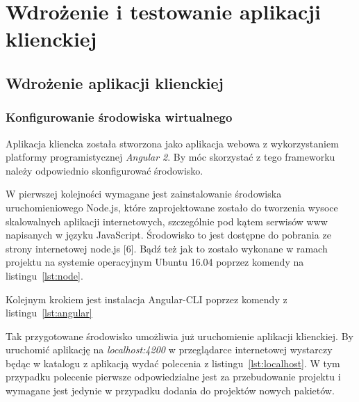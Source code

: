\chapter{Wdrożenie i testowanie aplikacji klienckiej}

\section{Wdrożenie aplikacji klienckiej}
\subsection{Konfigurowanie środowiska wirtualnego}
Aplikacja kliencka została stworzona jako aplikacja webowa z wykorzystaniem platformy programistycznej \textit{Angular 2}. By móc skorzystać z tego frameworku należy odpowiednio skonfigurować środowisko.

W pierwszej kolejności wymagane jest zainstalowanie środowiska uruchomieniowego Node.js, które zaprojektowane zostało do tworzenia wysoce skalowalnych aplikacji internetowych, szczególnie pod kątem serwisów www napisanych w języku JavaScript. \'Srodowisko to jest dostępne do pobrania ze strony internetowej node.js [6]. Bądź też jak to zostało wykonane w ramach projektu na systemie operacyjnym Ubuntu 16.04 poprzez komendy na listingu~\ref{lst:node}.

\lssetdef


Kolejnym krokiem jest instalacja Angular-CLI poprzez komendy z listingu~\ref{lst:angular}

\lssetdef


Tak przygotowane środowisko umożliwia już uruchomienie aplikacji klienckiej. By uruchomić aplikację na \textit{localhost:4200} w przeglądarce internetowej wystarczy będąc w katalogu z aplikacją wydać polecenia z listingu~\ref{lst:localhost}. W tym przypadku polecenie pierwsze odpowiedzialne jest za przebudowanie projektu i wymagane jest jedynie w przypadku dodania do projektów nowych pakietów.

\lssetdef


